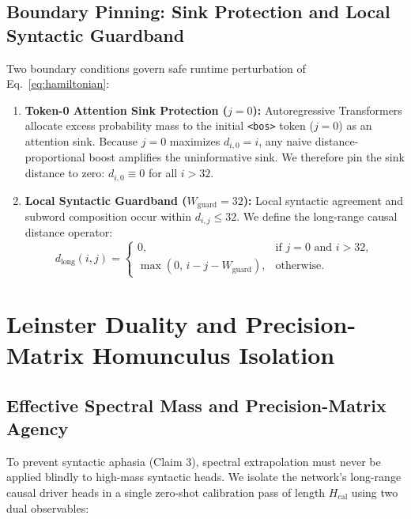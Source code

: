 \documentclass[11pt,letterpaper]{article}
\theoremstyle{definition}
\begin{document}
\subsection{Boundary Pinning: Sink Protection and Local Syntactic Guardband}
Two boundary conditions govern safe runtime perturbation of Eq.~\eqref{eq:hamiltonian}:
\begin{enumerate}
    \item \textbf{Token-0 Attention Sink Protection ($j = 0$):} Autoregressive Transformers allocate excess probability mass to the initial \texttt{<bos>} token ($j = 0$) as an attention sink. Because $j = 0$ maximizes $d_{i,0} = i$, any naive distance-proportional boost amplifies the uninformative sink. We therefore pin the sink distance to zero: $d_{i,0} \equiv 0$ for all $i > 32$.
    \item \textbf{Local Syntactic Guardband ($W_{\text{guard}} = 32$):} Local syntactic agreement and subword composition occur within $d_{i,j} \le 32$. We define the long-range causal distance operator:
    \begin{equation}
        d_{\text{long}}(i, j) = \begin{cases}
            0, & \text{if } j = 0 \text{ and } i > 32, \\
            \max(0,\, i - j - W_{\text{guard}}), & \text{otherwise.}
        \end{cases}
        \label{eq:d_long}
    \end{equation}
\end{enumerate}

\section{Leinster Duality and Precision-Matrix Homunculus Isolation}

\subsection{Effective Spectral Mass and Precision-Matrix Agency}
To prevent syntactic aphasia (Claim 3), spectral extrapolation must never be applied blindly to high-mass syntactic heads. We isolate the network's long-range causal driver heads in a single zero-shot calibration pass of length $H_{\text{cal}}$ using two dual observables:
\end{document}
